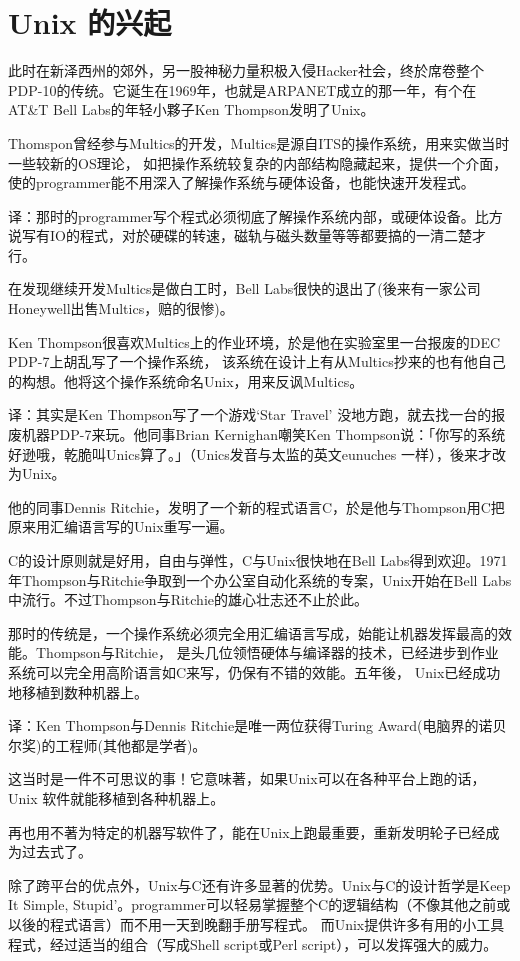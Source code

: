 \documentclass[a4paper,12pt,UTF8,twoside]{ctexbook}
\begin{document}
\chapter{Unix 的兴起}

此时在新泽西州的郊外，另一股神秘力量积极入侵Hacker社会，终於席卷整个PDP-10的传统。它诞生在1969年，也就是ARPANET成立的那一年，有个在AT\&T Bell Labs的年轻小夥子Ken Thompson发明了Unix。

Thomspon曾经参与Multics的开发，Multics是源自ITS的操作系统，用来实做当时一些较新的OS理论， 如把操作系统较复杂的内部结构隐藏起来，提供一个介面，使的programmer能不用深入了解操作系统与硬体设备，也能快速开发程式。

译：那时的programmer写个程式必须彻底了解操作系统内部，或硬体设备。比方说写有IO的程式，对於硬碟的转速，磁轨与磁头数量等等都要搞的一清二楚才行。

在发现继续开发Multics是做白工时，Bell Labs很快的退出了(後来有一家公司Honeywell出售Multics，赔的很惨)。

Ken Thompson很喜欢Multics上的作业环境，於是他在实验室里一台报废的DEC PDP-7上胡乱写了一个操作系统，  该系统在设计上有从Multics抄来的也有他自己的构想。他将这个操作系统命名Unix，用来反讽Multics。

译：其实是Ken Thompson写了一个游戏`Star Travel' 没地方跑，就去找一台的报废机器PDP-7来玩。他同事Brian Kernighan嘲笑Ken Thompson说：「你写的系统好逊哦，乾脆叫Unics算了。」（Unics发音与太监的英文eunuches 一样），後来才改为Unix。

他的同事Dennis Ritchie，发明了一个新的程式语言C，於是他与Thompson用C把原来用汇编语言写的Unix重写一遍。

C的设计原则就是好用，自由与弹性，C与Unix很快地在Bell Labs得到欢迎。1971年Thompson与Ritchie争取到一个办公室自动化系统的专案，Unix开始在Bell Labs中流行。不过Thompson与Ritchie的雄心壮志还不止於此。

那时的传统是，一个操作系统必须完全用汇编语言写成，始能让机器发挥最高的效能。Thompson与Ritchie， 是头几位领悟硬体与编译器的技术，已经进步到作业系统可以完全用高阶语言如C来写，仍保有不错的效能。五年後， Unix已经成功地移植到数种机器上。

译：Ken Thompson与Dennis Ritchie是唯一两位获得Turing Award(电脑界的诺贝尔奖)的工程师(其他都是学者)。

这当时是一件不可思议的事！它意味著，如果Unix可以在各种平台上跑的话，Unix 软件就能移植到各种机器上。

再也用不著为特定的机器写软件了，能在Unix上跑最重要，重新发明轮子已经成为过去式了。

除了跨平台的优点外，Unix与C还有许多显著的优势。Unix与C的设计哲学是Keep It Simple, Stupid'。programmer可以轻易掌握整个C的逻辑结构（不像其他之前或以後的程式语言）而不用一天到晚翻手册写程式。 而Unix提供许多有用的小工具程式，经过适当的组合（写成Shell script或Perl script），可以发挥强大的威力。
\end{document}
